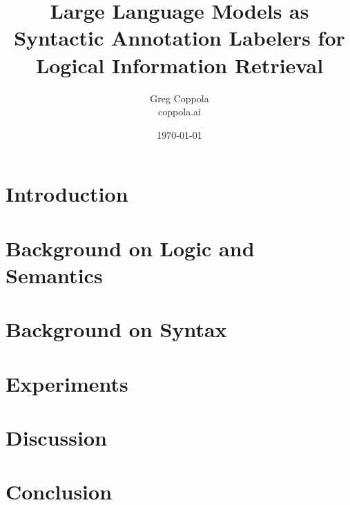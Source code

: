 \documentclass[11pt]{article}
\title{Large Language Models as Syntactic Annotation Labelers for Logical Information Retrieval}
\author{Greg Coppola\\coppola.ai}
\date{\today}
\begin{document}
\maketitle



\section{Introduction}


\section{Background on Logic and Semantics}


\section{Background on Syntax}


\section{Experiments}


\section{Discussion}


\section{Conclusion}




\end{document}
